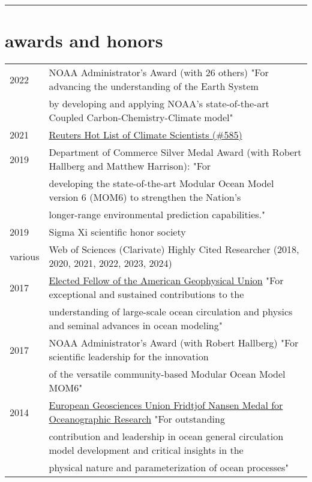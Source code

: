 \documentclass{article}
\begin{document}
\noindent\rule{\textwidth}{1pt}
\vspace{-1cm}
\section*{\sc  \color{Maroon}   awards and honors}
\vspace{-.25cm}

\begin{tabular}{ll}
  2022 & NOAA Administrator's Award (with 26 others) "For advancing the understanding of the Earth System \\ & by developing and applying NOAA's state-of-the-art Coupled Carbon-Chemistry-Climate model"
\\
  2021 & \href{https://app.dimensions.ai/details/entities/publication/author/ur.010052126545.52}{Reuters Hot List of Climate Scientists (\#585)} 
  \\
  2019 & Department of Commerce Silver Medal Award (with Robert Hallberg and Matthew Harrison): "For \\ &  developing the state-of-the-art Modular Ocean Model version 6 (MOM6) to strengthen the Nation's \\& longer-range environmental prediction capabilities."
  \\
  2019 & Sigma Xi scientific honor society 
  \\
  various  & Web of Sciences (Clarivate) Highly Cited Researcher (2018, 2020, 2021, 2022, 2023, 2024)
  \\
  2017 & \href{https://eos.org/agu-news/celebrating-the-2017-class-of-fellows}{Elected Fellow of the American Geophysical Union} "For exceptional and sustained contributions to the \\ &  understanding of large-scale ocean circulation and physics and seminal advances in ocean modeling"
\\
  2017 & NOAA Administrator's Award (with Robert Hallberg) "For scientific leadership for the innovation \\ & of the versatile  community-based Modular Ocean Model MOM6" 
  \\
  2014 & \href{http://www.egu.eu/awards-medals/fridtjof-nansen/2014/stephen-m-griffies/}{European Geosciences Union Fridtjof Nansen Medal for
         Oceanographic Research}  "For 
outstanding \\ & contribution and leadership in 
ocean general circulation model development 
and critical insights in the \\ & physical 
nature and parameterization of ocean processes"

\end{tabular}
\end{document}
